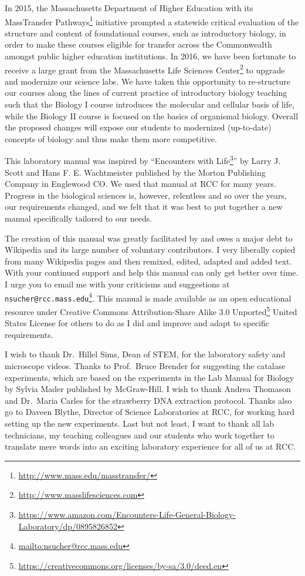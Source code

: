 \documentclass[]{book}
\let\rmarkdownfootnote\footnote%
\def\footnote{\protect\rmarkdownfootnote}
\renewcommand{\href}[2]{#2\footnote{\url{#1}}}
\theoremstyle{definition}
\theoremstyle{definition}
\theoremstyle{definition}
\theoremstyle{remark}
\begin{document}
In 2015, the Massachusetts Department of Higher Education with its
\href{http://www.mass.edu/masstransfer/}{MassTransfer Pathways}
initiative prompted a statewide critical evaluation of the structure and
content of foundational courses, such as introductory biology, in order
to make these courses eligible for transfer across the Commonwealth
amongst public higher education institutions. In 2016, we have been
fortunate to receive a large grant from the
\href{http://www.masslifesciences.com}{Massachusetts Life Sciences
Center} to upgrade and modernize our science labs. We have taken this
opportunity to re-structure our courses along the lines of current
practice of introductory biology teaching such that the Biology I course
introduces the molecular and cellular basis of life, while the Biology
II course is focused on the basics of organismal biology. Overall the
proposed changes will expose our students to modernized (up-to-date)
concepts of biology and thus make them more competitive.

This laboratory manual was inspired by
``\href{https://www.amazon.com/Encounters-Life-General-Biology-Laboratory/dp/0895826852}{Encounters
with Life}'' by Larry J. Scott and Hans F. E. Wachtmeister published by
the Morton Publishing Company in Englewood CO. We used that manual at
RCC for many years. Progress in the biological sciences is, however,
relentless and so over the years, our requirements changed, and we felt
that it was best to put together a new manual specifically tailored to
our needs.

The creation of this manual was greatly facilitated by and owes a major
debt to Wikipedia and its large number of voluntary contributors. I very
liberally copied from many Wikipedia pages and then remixed, edited,
adapted and added text. With your continued support and help this manual
can only get better over time. I urge you to email me with your
criticisms and suggestions at
\href{mailto:nsucher@rcc.mass.edu}{\nolinkurl{nsucher@rcc.mass.edu}}.
This manual is made available as an open educational resource under
\href{https://creativecommons.org/licenses/by-sa/3.0/deed.en}{Creative
Commons Attribution-Share Alike 3.0 Unported} United States License for
others to do as I did and improve and adapt to specific requirements.

I wish to thank Dr.~Hillel Sims, Dean of STEM, for the laboratory safety
and microscope videos. Thanks to Prof.~Bruce Brender for suggesting the
catalase experiments, which are based on the experiments in the Lab
Manual for Biology by Sylvia Mader published by McGraw-Hill. I wish to
thank Andrea Thomason and Dr.~Maria Carles for the strawberry DNA
extraction protocol. Thanks also go to Daveen Blythe, Director of
Science Laboratories at RCC, for working hard setting up the new
experiments. Last but not least, I want to thank all lab technicians, my
teaching colleagues and our students who work together to translate mere
words into an exciting laboratory experience for all of us at RCC.
\end{document}
